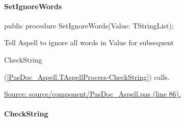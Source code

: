 \documentclass{report}
\newif\ifpdf
\begin{document}
\paragraph*{SetIgnoreWords}\hspace*{\fill}

\label{PasDoc_Aspell.TAspellProcess-SetIgnoreWords}
\begin{list}{}{
\setlength{\itemindent}{0cm}
\setlength{\listparindent}{0cm}
\setlength{\leftmargin}{\evensidemargin}
\addtolength{\leftmargin}{\tmplength}
\settowidth{\labelsep}{X}
\addtolength{\leftmargin}{\labelsep}
\setlength{\labelwidth}{\tmplength}
}
\item[\textbf{Declaration}\hfill]
\ifpdf
\begin{flushleft}
\fi
\begin{ttfamily}
public procedure SetIgnoreWords(Value: TStringList);\end{ttfamily}

\ifpdf
\end{flushleft}
\fi

\par
\item[\textbf{Description}]
Tell Aspell to ignore all words in Value for subsequent \begin{ttfamily}CheckString\end{ttfamily}(\ref{PasDoc_Aspell.TAspellProcess-CheckString}) calls.\par
\href{https://github.com/pasdoc/pasdoc/blob/master/source/component/PasDoc_Aspell.pas#L86}{Source: source/component/PasDoc{\_}Aspell.pas (line 86).}

\end{list}
\paragraph*{CheckString}\hspace*{\fill}
\end{document}
